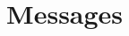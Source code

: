 

\section{\ProCom\ Messages}

\def\MSG#1{\item[#1]\ \\}
\def\MSGS#1#2{\item[#1]\vspace{-1ex}\item[#2]\ \\}

